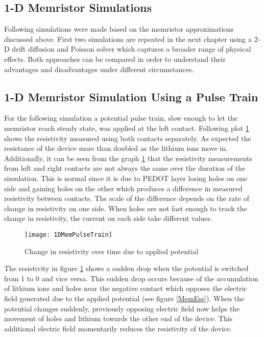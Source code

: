 \begin{doublespace}
\clearpage
\section{1-D Memristor Simulations}

Following simulations were made based on the memristor approximations discussed above. First two simulations are repeated in the next chapter using a 2-D drift diffusion and Poisson solver which captures a broader range of physical effects. Both approaches can be compared in order to understand their advantages and disadvantages under different circumstances.

\subsection{1-D Memristor Simulation Using a Pulse Train}
  
For the following simulation a potential pulse train, slow enough to let the memristor reach steady state, was applied at the left contact. Following plot \ref{MemResTrain} shows the resistivity measured using both contacts separately. As expected the resistance of the device more than doubled as the lithium ions move in. Additionally, it can be seen from the graph \ref{MemResTrain} that the resistivity measurements from left and right contacts are not always the same over the duration of the simulation. This is normal since it is due to PEDOT layer losing holes on one side and gaining holes on the other which produces a difference in measured resistivity between contacts. The scale of the difference depends on the rate of change in resistivity on one side. When holes are not fast enough to track the change in resistivity, the current on each side take different values.  

\begin{figure}[!htp]
\centering
\texttt{[image: 1DMemPulseTrain]}
\caption{Change in resistivity over time due to applied potential} 
\label{MemResTrain}
\end{figure}

The resistivity in figure \ref{MemResTrain} shows a sudden drop when the potential is switched from 1 to 0 and vice versa. This sudden drop occurs because of the accumulation of lithium ions and holes near the negative contact which opposes the electric field generated due to the applied potential (see figure \ref{MemEss}). When the potential changes suddenly, previously opposing electric field now helps the movement of holes and lithium towards the other end of the device. This additional electric field momentarily reduces the resistivity of the device.


\end{doublespace}
